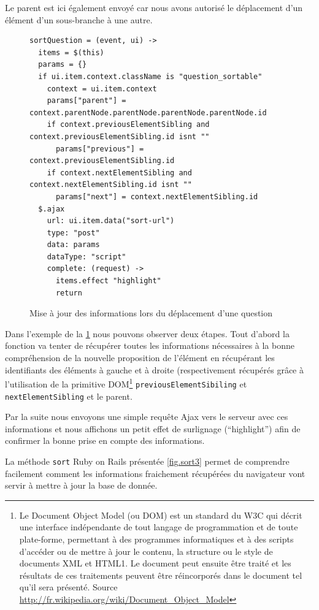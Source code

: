 \documentclass[12pt,a4paper]{book}
\begin{document}
Le parent est ici également envoyé car nous avons autorisé le déplacement d'un élément d'un sous-branche à une autre.

\begin{figure}[h]
\begin{lstlisting}
sortQuestion = (event, ui) ->
  items = $(this)
  params = {}
  if ui.item.context.className is "question_sortable"
    context = ui.item.context
    params["parent"] = context.parentNode.parentNode.parentNode.parentNode.id
    if context.previousElementSibling and context.previousElementSibling.id isnt ""
      params["previous"] = context.previousElementSibling.id
    if context.nextElementSibling and context.nextElementSibling.id isnt ""
      params["next"] = context.nextElementSibling.id 
  $.ajax
    url: ui.item.data("sort-url")
    type: "post"
    data: params
    dataType: "script"
    complete: (request) ->
      items.effect "highlight"
      return
\end{lstlisting}
 \caption{Mise à jour des informations lors du déplacement d'une question}
 \label{fig.sort2}
\end{figure}

Dans l'exemple de la \cref{fig.sort2} nous pouvons observer deux étapes. Tout d'abord la fonction va tenter de récupérer toutes les informations nécessaires à la bonne compréhension de la nouvelle proposition de l'élément en récupérant les identifiants des éléments à gauche et à droite (respectivement récupérés grâce à l'utilisation de la primitive DOM\footnote{Le Document Object Model (ou DOM) est un standard du W3C qui décrit une interface indépendante de tout langage de programmation et de toute plate-forme, permettant à des programmes informatiques et à des scripts d'accéder ou de mettre à jour le contenu, la structure ou le style de documents XML et HTML1. Le document peut ensuite être traité et les résultats de ces traitements peuvent être réincorporés dans le document tel qu'il sera présenté. Source \url{http://fr.wikipedia.org/wiki/Document_Object_Model}} \texttt{previousElementSibiling} et \texttt{nextElementSibling} et le parent.

Par la suite nous envoyons une simple requête Ajax vers le serveur avec ces informations et nous affichons un petit effet de surlignage (``highlight'') afin de confirmer la bonne prise en compte des informations.

La méthode \texttt{sort} Ruby on Rails présentée \cref{fig.sort3} permet de comprendre facilement comment les informations fraichement récupérées du navigateur vont servir à mettre à jour la base de donnée. 
\end{document}
